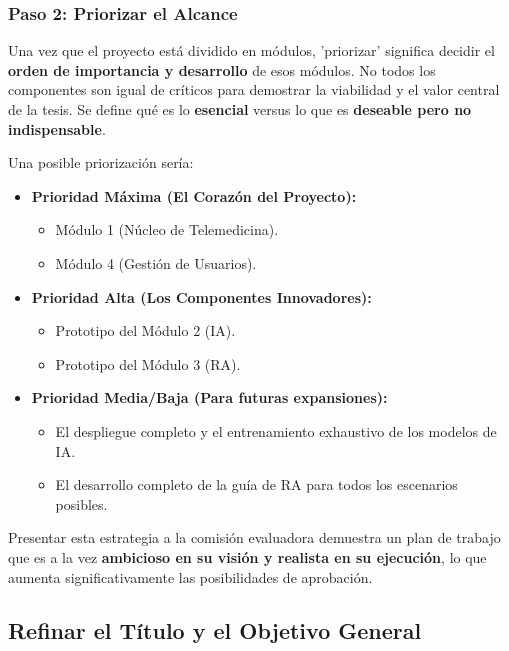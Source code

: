 \documentclass{article}
\begin{document}
\subsubsection{Paso 2: Priorizar el Alcance}

Una vez que el proyecto está dividido en módulos, 'priorizar' significa decidir el \textbf{orden de importancia y desarrollo} de esos módulos. No todos los componentes son igual de críticos para demostrar la viabilidad y el valor central de la tesis. Se define qué es lo \textbf{esencial} versus lo que es \textbf{deseable pero no indispensable}.

Una posible priorización sería:
\begin{itemize}
    \item \textbf{Prioridad Máxima (El Corazón del Proyecto):}
    \begin{itemize}
        \item Módulo 1 (Núcleo de Telemedicina).
        \item Módulo 4 (Gestión de Usuarios).
    \end{itemize}
    \item \textbf{Prioridad Alta (Los Componentes Innovadores):}
    \begin{itemize}
        \item Prototipo del Módulo 2 (IA).
        \item Prototipo del Módulo 3 (RA).
    \end{itemize}
    \item \textbf{Prioridad Media/Baja (Para futuras expansiones):}
    \begin{itemize}
        \item El despliegue completo y el entrenamiento exhaustivo de los modelos de IA.
        \item El desarrollo completo de la guía de RA para todos los escenarios posibles.
    \end{itemize}
\end{itemize}

Presentar esta estrategia a la comisión evaluadora demuestra un plan de trabajo que es a la vez \textbf{ambicioso en su visión y realista en su ejecución}, lo que aumenta significativamente las posibilidades de aprobación.

\subsection{Refinar el Título y el Objetivo General}
\end{document}
